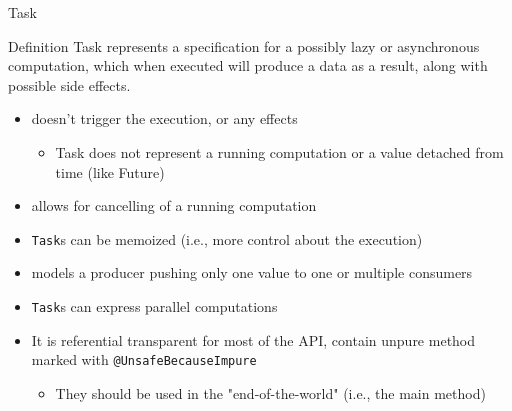 \documentclass[presentation, 9pt]{beamer}\mode<presentation>{\usetheme{AMSBolognaFC}}
\begin{document}
\begin{frame}{Task \href{https://monix.io/docs/current/eval/task.html}{\faLink}}
	\begin{alertblock}{Definition}
		Task represents a specification for a possibly lazy or asynchronous
computation, which when executed will produce a data as a result, along
with possible side effects.
	\end{alertblock}
	\begin{itemize}
  	\item doesn’t trigger the execution, or any effects 
		\begin{itemize}
			\item  Task does not represent a running computation or a value detached from time (like Future)
		\end{itemize}
   	\item allows for cancelling of a running computation
    \item \texttt{Task}s can be memoized (i.e., more control about the execution)
    \item models a producer pushing only one value to one or multiple consumers
    \item \texttt{Task}s can express parallel computations
    \item It is referential transparent for most of the API, contain unpure method marked with \texttt{@UnsafeBecauseImpure}
    \begin{itemize}
			\item They should be used in the "end-of-the-world" (i.e., the main method)
		\end{itemize}
	\end{itemize}
\end{frame}
\end{document}
